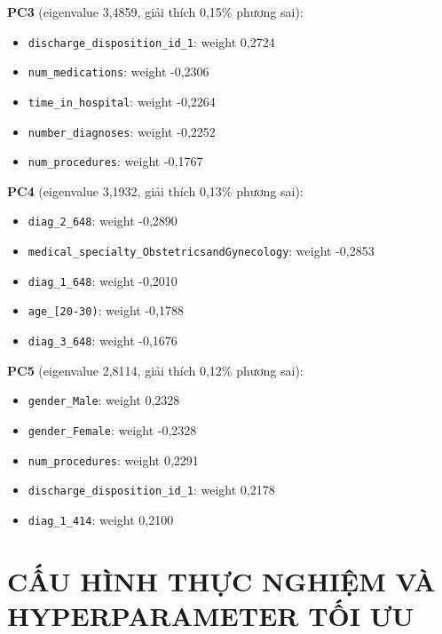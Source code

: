 \documentclass[a4paper]{report}
\begin{document}
\textbf{PC3} (eigenvalue 3,4859, giải thích 0,15\% phương sai):

\begin{itemize}
  \item \texttt{discharge\_\allowbreak{}disposition\_\allowbreak{}id\_\allowbreak{}1}: weight 0,2724
  \item \texttt{num\_\allowbreak{}medications}: weight -0,2306
  \item \texttt{time\_\allowbreak{}in\_\allowbreak{}hospital}: weight -0,2264
  \item \texttt{number\_\allowbreak{}diagnoses}: weight -0,2252
  \item \texttt{num\_\allowbreak{}procedures}: weight -0,1767
\end{itemize}

\textbf{PC4} (eigenvalue 3,1932, giải thích 0,13\% phương sai):

\begin{itemize}
  \item \texttt{diag\_\allowbreak{}2\_\allowbreak{}648}: weight -0,2890
  \item \texttt{medical\_\allowbreak{}specialty\_\allowbreak{}ObstetricsandGynecology}: weight -0,2853
  \item \texttt{diag\_\allowbreak{}1\_\allowbreak{}648}: weight -0,2010
  \item \texttt{age\_\allowbreak{}[20-30)}: weight -0,1788
  \item \texttt{diag\_\allowbreak{}3\_\allowbreak{}648}: weight -0,1676
\end{itemize}

\textbf{PC5} (eigenvalue 2,8114, giải thích 0,12\% phương sai):

\begin{itemize}
  \item \texttt{gender\_\allowbreak{}Male}: weight 0,2328
  \item \texttt{gender\_\allowbreak{}Female}: weight -0,2328
  \item \texttt{num\_\allowbreak{}procedures}: weight 0,2291
  \item \texttt{discharge\_\allowbreak{}disposition\_\allowbreak{}id\_\allowbreak{}1}: weight 0,2178
  \item \texttt{diag\_\allowbreak{}1\_\allowbreak{}414}: weight 0,2100
\end{itemize}

\section{CẤU HÌNH THỰC NGHIỆM VÀ HYPERPARAMETER TỐI ƯU}
\end{document}
